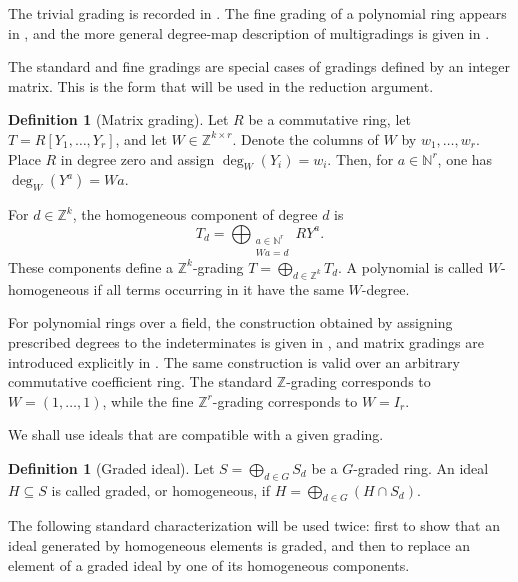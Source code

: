 \documentclass[preprint,12pt,3p]{elsarticle}
\theoremstyle{definition}
\newtheorem{definition}[theorem]{Definition}
\theoremstyle{remark}
\begin{document}
	The trivial grading is recorded in
	\cite[Chapter~A, Example~1.1.2(2), p.~2]
	{NastasescuVanOystaeyen1982}. The fine grading of a polynomial ring
	appears in \cite[p.~4]{MillerSturmfels2005}, and the more general
	degree-map description of multigradings is given in
	\cite[Definition~8.1, pp.~149--150]{MillerSturmfels2005}.
	
	The standard and fine gradings are special cases of gradings defined
	by an integer matrix. This is the form that will be used in the
	reduction argument.
	
	\begin{definition}[Matrix grading]
		\label{def:matrix-grading}
		Let $R$ be a commutative ring, let
		$T=R[Y_1,\ldots,Y_r]$, and let
		$W\in\mathbb Z^{k\times r}$. Denote the columns of $W$ by
		$w_1,\ldots,w_r$. Place $R$ in degree zero and assign
		$\deg_W(Y_i)=w_i$. Then, for $a\in\mathbb N^r$, one has
		$\deg_W(Y^a)=Wa$.
		
		For $d\in\mathbb Z^k$, the homogeneous component of degree $d$ is
		\[
		T_d=
		\bigoplus_{\substack{a\in\mathbb N^r\\Wa=d}}RY^a.
		\]
		These components define a $\mathbb Z^k$-grading
		$T=\bigoplus_{d\in\mathbb Z^k}T_d$. A polynomial is called
		$W$-homogeneous if all terms occurring in it have the same
		$W$-degree.
	\end{definition}
	
	For polynomial rings over a field, the construction obtained by
	assigning prescribed degrees to the indeterminates is given in
	\cite[Proposition~4.1.1, pp.~16--17]
	{KreuzerRobbiano2005}, and matrix gradings are introduced explicitly
	in \cite[Definition~4.1.6, p.~18]{KreuzerRobbiano2005}. The same
	construction is valid over an arbitrary commutative coefficient ring.
	The standard $\mathbb Z$-grading corresponds to
	$W=(1,\ldots,1)$, while the fine $\mathbb Z^r$-grading corresponds to
	$W=I_r$.
	
	We shall use ideals that are compatible with a given grading.
	
	\begin{definition}[Graded ideal]
		\label{def:graded-ideal}
		Let $S=\bigoplus_{d\in G}S_d$ be a $G$-graded ring. An ideal
		$H\subseteq S$ is called graded, or homogeneous, if
		$H=\bigoplus_{d\in G}(H\cap S_d)$.
	\end{definition}
	
	The following standard characterization will be used twice: first to
	show that an ideal generated by homogeneous elements is graded, and
	then to replace an element of a graded ideal by one of its homogeneous
	components.
	
\end{document}
